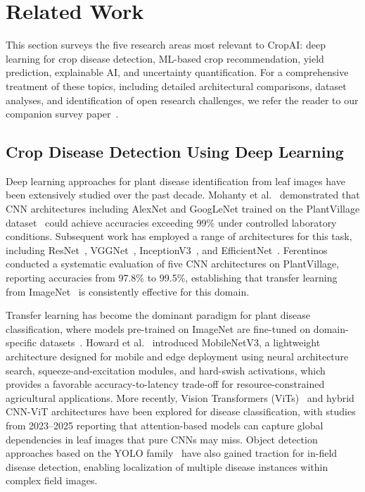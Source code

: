 \documentclass[conference]{IEEEtran}
\begin{document}
\section{Related Work}
\label{sec:related_work}

This section surveys the five research areas most relevant to CropAI: deep learning for crop disease detection, ML-based crop recommendation, yield prediction, explainable AI, and uncertainty quantification. For a comprehensive treatment of these topics, including detailed architectural comparisons, dataset analyses, and identification of open research challenges, we refer the reader to our companion survey paper~\cite{cropai_survey2026}.

\subsection{Crop Disease Detection Using Deep Learning}

Deep learning approaches for plant disease identification from leaf images have been extensively studied over the past decade. Mohanty et al.~\cite{mohanty2016using} demonstrated that CNN architectures including AlexNet and GoogLeNet trained on the PlantVillage dataset~\cite{hughes2015open} could achieve accuracies exceeding 99\% under controlled laboratory conditions. Subsequent work has employed a range of architectures for this task, including ResNet~\cite{he2016deep}, VGGNet~\cite{simonyan2015very}, InceptionV3~\cite{szegedy2016rethinking}, and EfficientNet~\cite{tan2019efficientnet}. Ferentinos~\cite{ferentinos2018deep} conducted a systematic evaluation of five CNN architectures on PlantVillage, reporting accuracies from 97.8\% to 99.5\%, establishing that transfer learning from ImageNet~\cite{deng2009imagenet} is consistently effective for this domain.

Transfer learning has become the dominant paradigm for plant disease classification, where models pre-trained on ImageNet are fine-tuned on domain-specific datasets~\cite{too2019comparative}. Howard et al.~\cite{howard2019searching} introduced MobileNetV3, a lightweight architecture designed for mobile and edge deployment using neural architecture search, squeeze-and-excitation modules, and hard-swish activations, which provides a favorable accuracy-to-latency trade-off for resource-constrained agricultural applications. More recently, Vision Transformers (ViTs)~\cite{dosovitskiy2021image} and hybrid CNN-ViT architectures have been explored for disease classification, with studies from 2023--2025 reporting that attention-based models can capture global dependencies in leaf images that pure CNNs may miss. Object detection approaches based on the YOLO family~\cite{jocher2023yolov8} have also gained traction for in-field disease detection, enabling localization of multiple disease instances within complex field images.
\end{document}
